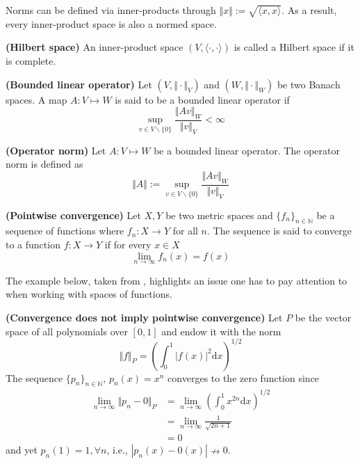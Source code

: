 Norms can be defined via inner-products through $\Vert x \Vert := \sqrt{\langle x, x\rangle}$. As a result, every inner-product space is also a normed space.

\begin{definition}
	\textbf{(Hilbert space)}
	An inner-product space $(V,\langle \cdot, \cdot \rangle)$ is called a Hilbert space if it is complete.
\end{definition}

\begin{definition}
	\textbf{(Bounded linear operator)}
	Let $(V, \Vert \cdot \Vert_V)$ and $(W, \Vert \cdot \Vert_W)$ be two Banach spaces. A map $A:V \mapsto W$ is said to be a bounded linear operator if
	\begin{equation}
		\sup_{v \in V \backslash \{0\}} \frac{ \Vert Av \Vert_W }{ \Vert v \Vert_V } < \infty
	\end{equation}
\end{definition}

\begin{definition}
	\label{def.operator_norm}
	\textbf{(Operator norm)}
	Let $A:V \mapsto W$ be a bounded linear operator. The operator norm is defined as
	\begin{equation}
		\Vert A \Vert := \sup_{v \in V \backslash \{0\}} \frac{ \Vert Av \Vert_W }{ \Vert v \Vert_V } 
	\end{equation}
\end{definition}

\begin{definition}
	\textbf{(Pointwise convergence)}
	Let $X, Y$ be two metric spaces and $\{f_n\}_{n\in\mathbb{N}}$ be a sequence of functions where $f_n : X \rightarrow Y$ for all $n$. The sequence is said to converge to a function $f: X \rightarrow Y$ if for every $x \in X$
	\begin{equation}
		\lim_{n \rightarrow \infty} f_n(x) = f(x)
	\end{equation}
\end{definition}

The example below, taken from \cite[§1]{berlinet2011reproducing}, highlights an issue one has to pay attention to when working with spaces of functions.

\begin{example}
	\label{ex.appendix_convergence}
	\textbf{(Convergence does not imply pointwise convergence)}
	Let $P$ be the vector space of all polynomials over $[0,1]$ and endow it with the norm
	\begin{equation}
		\Vert f \Vert_{P} = \left( \int_{0}^{1} |f(x)|^2 \text{d}x \right)^{1/2}
	\end{equation}
	The sequence $\{p_n\}_{n\in\mathbb{N}}, \, p_n(x) = x^n$ converges to the zero function since
	\begin{align}
		\lim_{n \rightarrow \infty} \Vert p_n - 0\Vert_{P} &= \lim_{n \rightarrow \infty} \left( \int_{0}^{1} x^{2n} \text{d}x \right)^{1/2} \\
		&= \lim_{n \rightarrow \infty} \frac{1}{\sqrt{2n+1}} \\
		&= 0
	\end{align}
	and yet $p_n(1) = 1, \forall n$, i.e., $|p_n(x) - 0(x)| \nrightarrow 0$.
\end{example}

